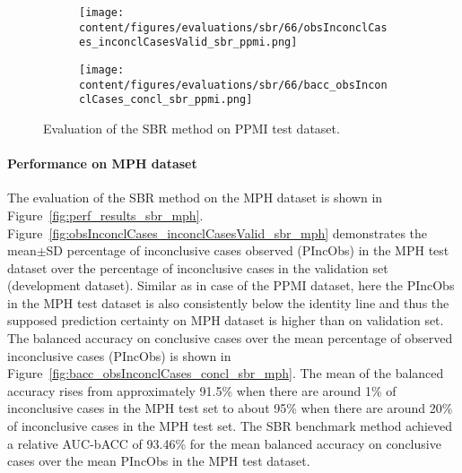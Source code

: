 \begin{figure}[ht]
  \begin{subfigure}{0.49\textwidth}
    \centering
    \texttt{[image: content/figures/evaluations/sbr/66/obsInconclCases\_inconclCasesValid\_sbr\_ppmi.png]}
    \label{fig:obsInconclCases_inconclCasesValid_sbr_ppmi}
  \end{subfigure}
  \hfill
  \begin{subfigure}{0.49\textwidth}
    \centering
    \texttt{[image: content/figures/evaluations/sbr/66/bacc\_obsInconclCases\_concl\_sbr\_ppmi.png]}
    \label{fig:bacc_obsInconclCases_concl_sbr_ppmi}
  \end{subfigure}
  \caption{Evaluation of the SBR method on PPMI test dataset.}
  \label{fig:perf_results_sbr_ppmi}
\end{figure}




\paragraph{Performance on MPH dataset}

The evaluation of the SBR method on the MPH dataset is shown in Figure~\ref{fig:perf_results_sbr_mph}.
Figure~\ref{fig:obsInconclCases_inconclCasesValid_sbr_mph} demonstrates 
the mean$\pm$SD percentage of inconclusive cases observed (PIncObs) in the MPH test dataset 
over the percentage of inconclusive cases in the validation set (development dataset).
Similar as in case of the PPMI dataset, here the PIncObs in the MPH test dataset
is also consistently below the identity line 
and thus the supposed prediction certainty on MPH dataset is higher than on validation set.
The balanced accuracy on conclusive cases over the mean percentage of observed inconclusive cases (PIncObs) is shown 
in Figure~\ref{fig:bacc_obsInconclCases_concl_sbr_mph}.
The mean of the balanced accuracy rises from approximately 91.5\% 
when there are around 1\% of inconclusive cases in the MPH test set to about 95\% 
when there are around 20\% of inconclusive cases in the MPH test set.
The SBR benchmark method achieved a relative AUC-bACC of 93.46\% for the mean balanced accuracy on conclusive cases 
over the mean PIncObs in the MPH test dataset.


